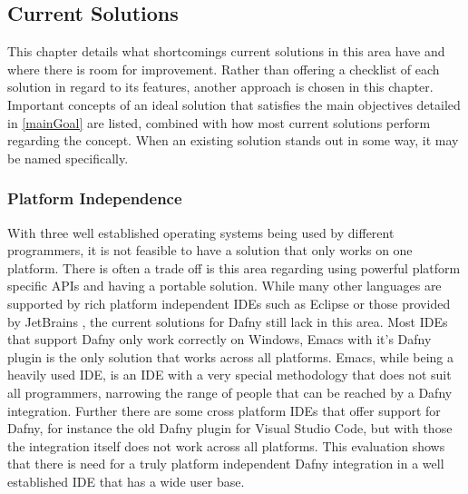 \subsection{Current Solutions}
This chapter details what shortcomings current solutions in this area have and where there is room for improvement. Rather than offering a checklist of each solution in regard to its features, another approach is chosen in this chapter. Important concepts of an ideal solution that satisfies the main objectives detailed in \ref{mainGoal} are listed, combined with how most current solutions perform regarding the concept. When an existing solution stands out in some way, it may be named specifically. \newline

\subsubsection{Platform Independence}
With three well established operating systems being used by different programmers, it is not feasible to have a solution that only works on one platform. There is often a trade off is this area regarding using powerful platform specific APIs and having a portable solution. While many other languages are supported by rich platform independent IDEs such as Eclipse \cite{eclipse} or those provided by JetBrains \cite{jetbrains}, the current solutions for Dafny still lack in this area. \newline
Most IDEs that support Dafny only work correctly on Windows, Emacs \cite{GNU} with it's Dafny plugin is the only solution that works across all platforms. Emacs, while being a heavily used IDE, is an IDE with a very special methodology that does not suit all programmers, narrowing the range of people that can be reached by a Dafny integration. Further there are some cross platform IDEs that offer support for Dafny, for instance the old Dafny plugin for Visual Studio Code, but with those the integration itself does not work across all platforms. \newline
This evaluation shows that there is need for a truly platform independent Dafny integration in a well established IDE that has a wide user base. \newline
 
